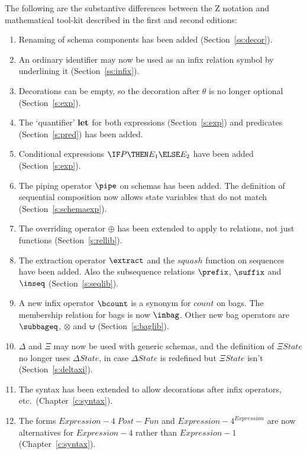 The following are the substantive differences between the Z notation and
mathematical tool-kit described in the first and second editions:
\begin{enumerate}
\item Renaming of schema components has been added
	(Section~\ref{ss:decor}).

\item An ordinary identifier may now be used as an infix relation
	symbol by underlining it (Section~\ref{ss:infix}).

\item Decorations can be empty, so the decoration after $\theta$
	is no longer optional (Section~\ref{s:exp}).

\item The `quantifier' $\bf let$ for both expressions
	(Section~\ref{s:exp}) and predicates (Section~\ref{s:pred})
	has been added.

\item Conditional expressions $\IF P \THEN E_1 \ELSE E_2$ have been
	added (Section~\ref{s:exp}).

\item The piping operator $\pipe$ on schemas has been added.  The
	definition of sequential composition now allows state
	variables that do not match (Section~\ref{s:schemaexp}).

\item The overriding operator $\oplus$ has been extended to apply to
	relations, not just functions (Section~\ref{s:rellib}).

\item The extraction operator $\extract$ and the $squash$ function
	on sequences have been added.  Also the subsequence
	relations $\prefix$, $\suffix$ and $\inseq$
	(Section~\ref{s:seqlib}).

\item A new infix operator $\bcount$ is a synonym for $count$ on
	bags. The membership relation for bags is now $\inbag$.
	Other new bag operators are $\subbageq$, $\otimes$ and
	$\uminus$ (Section~\ref{s:baglib}).

\item $\Delta$ and $\Xi$ may now be used with generic schemas, and
	the definition of $\Xi State$ no longer uses $\Delta State$,
	in case $\Delta State$ is redefined but $\Xi State$ isn't
	(Section~\ref{s:deltaxi}).

\item The syntax has been extended to allow decorations after infix
	operators, etc.\ (Chapter~\ref{c:syntax}).

\item The forms \(Expression-4\;Post-Fun\) and
	\(Expression-4^{Expression}\) are now alternatives for
	\(Expression-4\) rather than \(Expression-1\)
	(Chapter~\ref{c:syntax}).
\end{enumerate}
